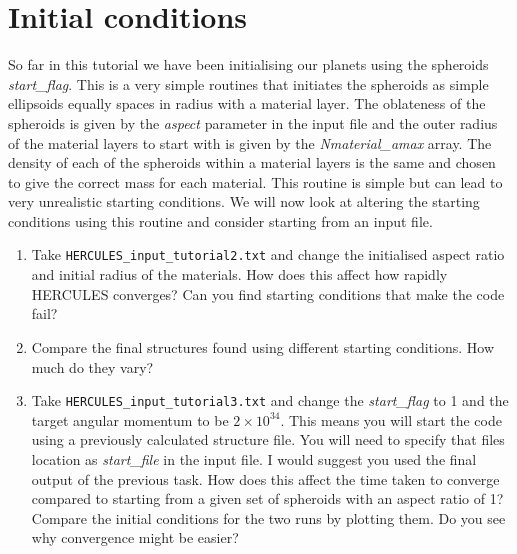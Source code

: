 \documentclass[11pt, oneside]{article}   	%
\begin{document}
\section{Initial conditions}
\label{sec:init}

So far in this tutorial we have been initialising our planets using the spheroids {\it start\_flag}. This is a very simple routines that initiates the spheroids as simple ellipsoids equally spaces in radius with a material layer. The oblateness of the spheroids is given by the {\it aspect} parameter in the input file and the outer radius of the material layers to start with is given by the {\it Nmaterial\_amax} array. The density of each of the spheroids within a material layers is the same and chosen to give the correct mass for each material. This routine is simple but can lead to very unrealistic starting conditions. We will now look at altering the starting conditions using this routine and consider starting from an input file. 

\begin{enumerate}

\item Take \texttt{HERCULES\_input\_tutorial2.txt} and change the initialised aspect ratio and initial radius of the materials. How does this affect how rapidly HERCULES converges? Can you find starting conditions that make the code fail?

\item Compare the final structures found using different starting conditions. How much do they vary?

\item Take \texttt{HERCULES\_input\_tutorial3.txt} and change the {\it start\_flag} to 1 and the target angular momentum to be $2\times 10^{34}$. This means you will start the code using a previously calculated structure file. You will need to specify that files location as {\it start\_file} in the input file. I would suggest you used the final output of the previous task. How does this affect the time taken to converge compared to starting from a given set of spheroids with an aspect ratio of 1? Compare the initial conditions for the two runs by plotting them. Do you see why convergence might be easier?

\end{enumerate}

\end{document}
